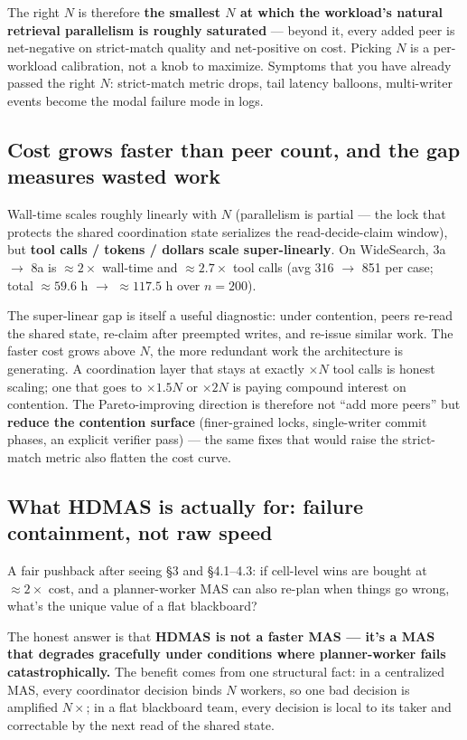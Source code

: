\documentclass[11pt]{article}
\begin{document}
The right $N$ is therefore \textbf{the smallest $N$ at which the workload's natural retrieval parallelism is roughly saturated} --- beyond it, every added peer is net-negative on strict-match quality and net-positive on cost. Picking $N$ is a per-workload calibration, not a knob to maximize. Symptoms that you have already passed the right $N$: strict-match metric drops, tail latency balloons, multi-writer events become the modal failure mode in logs.

\subsection{Cost grows faster than peer count, and the gap measures wasted work}

Wall-time scales roughly linearly with $N$ (parallelism is partial --- the lock that protects the shared coordination state serializes the read-decide-claim window), but \textbf{tool calls / tokens / dollars scale super-linearly}. On WideSearch, 3a $\to$ 8a is $\approx 2\times$ wall-time and $\approx 2.7\times$ tool calls (avg 316 $\to$ 851 per case; total $\approx 59.6$ h $\to$ $\approx 117.5$ h over $n=200$).

The super-linear gap is itself a useful diagnostic: under contention, peers re-read the shared state, re-claim after preempted writes, and re-issue similar work. The faster cost grows above $N$, the more redundant work the architecture is generating. A coordination layer that stays at exactly $\times N$ tool calls is honest scaling; one that goes to $\times 1.5N$ or $\times 2N$ is paying compound interest on contention. The Pareto-improving direction is therefore not ``add more peers'' but \textbf{reduce the contention surface} (finer-grained locks, single-writer commit phases, an explicit verifier pass) --- the same fixes that would raise the strict-match metric also flatten the cost curve.

\subsection{What HDMAS is actually for: failure containment, not raw speed}

A fair pushback after seeing \S3 and \S4.1--4.3: if cell-level wins are bought at $\approx 2\times$ cost, and a planner-worker MAS can also re-plan when things go wrong, what's the unique value of a flat blackboard?

The honest answer is that \textbf{HDMAS is not a faster MAS --- it's a MAS that degrades gracefully under conditions where planner-worker fails catastrophically.} The benefit comes from one structural fact: in a centralized MAS, every coordinator decision binds $N$ workers, so one bad decision is amplified $N\times$; in a flat blackboard team, every decision is local to its taker and correctable by the next read of the shared state.
\end{document}
